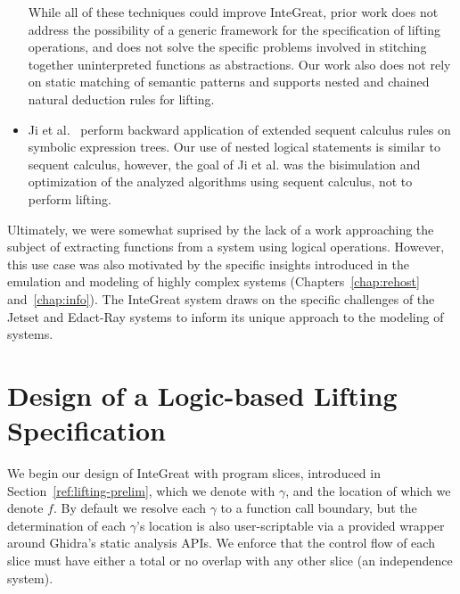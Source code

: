 \begin{itemize}
	While all of these techniques could improve InteGreat, prior work does not address the possibility of a generic framework for the specification of lifting operations, and does not solve the specific problems involved in stitching together uninterpreted functions as abstractions.
	Our work also does not rely on static matching of semantic patterns and supports nested and chained natural deduction rules for lifting.
	\item Ji et al.~\cite{transformation} perform backward application of extended sequent calculus rules on symbolic expression trees.
	Our use of nested logical statements is similar to sequent calculus, however, the goal of Ji et al. was the bisimulation and optimization of the analyzed algorithms using sequent calculus, not to perform lifting.
\end{itemize}

Ultimately, we were somewhat suprised by the lack of a work approaching the subject of extracting functions from a system using logical operations.
However, this use case was also motivated by the specific insights introduced in the emulation and modeling of highly complex systems (Chapters~\ref{chap:rehost} and~\ref{chap:info}).
The InteGreat system draws on the specific challenges of the Jetset and Edact-Ray systems to inform its unique approach to the modeling of systems.

\section{Design of a Logic-based Lifting Specification}

We begin our design of InteGreat with program slices, introduced in Section~\ref{ref:lifting-prelim}, which we denote with $\gamma$, and the location of which we denote $f$.
By default we resolve each $\gamma$ to a function call boundary, but the determination of each $\gamma$'s location is also user-scriptable via a provided wrapper around Ghidra's static analysis APIs.
We enforce that the control flow of each slice must have either a total or no overlap with any other slice (an independence system).

